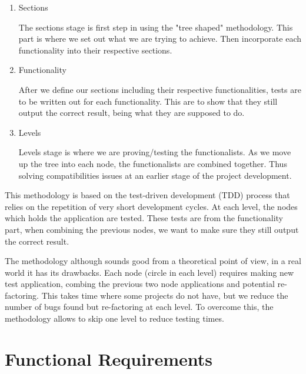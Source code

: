 \begin{enumerate}
  \item Sections
  
    The sections stage is first step in using the "tree shaped" methodology. This part is where we set out what we are trying to achieve. Then incorporate each functionality into their respective sections.
    
  \item Functionality   
    
     After we define our sections including their respective functionalities, tests are to be written out for each functionality. This are to show that they still output the correct result, being what they are supposed to do.
    
  \item Levels
  
    Levels stage is where we are proving/testing the functionalists. As we move up the tree into each node, the functionalists are combined together. Thus solving compatibilities issues at an earlier stage of the project development.
\end{enumerate}

This methodology is based on the test-driven development (TDD) process that relies on the repetition of very short development cycles. At each level, the nodes which holds the application are tested. These tests are from the functionality part, when combining the previous nodes, we want to make sure they still output the correct result.

The methodology although sounds good from a theoretical point of view, in a real world it has its drawbacks. Each node (circle in each level) requires making new test application, combing the previous two node applications and potential re-factoring. This takes time where some projects do not have, but we reduce the number of bugs found but re-factoring at each level. To overcome this, the methodology allows to skip one level to reduce testing times.


\section{Functional Requirements}



